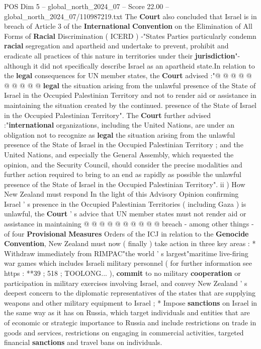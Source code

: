 \begin{textsample}{POS Dim 5 – global\_north\_2024\_07 – Score 22.00 – global\_north\_2024\_07/110987219.txt}
The \textbf{Court} also concluded that Israel is in breach of Article 3 of the \textbf{International} \textbf{Convention} on the Elimination of All Forms of \textbf{Racial} Discrimination ( ICERD ) -"States Parties particularly condemn \textbf{racial} segregation and apartheid and undertake to prevent, prohibit and eradicate all practices of this nature in territories under their \textbf{jurisdiction}"- although it did not specifically describe Israel as an apartheid state.In relation to the \textbf{legal} consequences for UN member states, the \textbf{Court} advised :"@ @ @ @ @ @ @ @ @ @ \textbf{legal} the situation arising from the unlawful presence of the State of Israel in the Occupied Palestinian Territory and not to render aid or assistance in maintaining the situation created by the continued. presence of the State of Israel in the Occupied Palestinian Territory".
The \textbf{Court} further advised :"\textbf{international} organizations, including the United Nations, are under an obligation not to recognize as \textbf{legal} the situation arising from the unlawful presence of the State of Israel in the Occupied Palestinian Territory ; and the United Nations, and especially the General Assembly, which requested the opinion, and the Security Council, should consider the precise modalities and further action required to bring to an end as rapidly as possible the unlawful presence of the State of Israel in the Occupied Palestinian Territory". ii ) How New Zealand must respond In the light of this Advisory Opinion confirming Israel ' s presence in the Occupied Palestinian Territories ( including Gaza ) is unlawful, the \textbf{Court} ' s advice that UN member states must not render aid or assistance in maintaining @ @ @ @ @ @ @ @ @ @ breach - among other things - of four \textbf{Provisional} \textbf{Measures} Orders of the ICJ in relation to the \textbf{Genocide} \textbf{Convention}, New Zealand must now ( finally ) take action in three key areas : * Withdraw immediately from RIMPAC"the world ' s largest"maritime live-firing war games which includes Israeli military personnel ( for further information see https : **39 ; 518 ; TOOLONG... ), \textbf{commit} to no military \textbf{cooperation} or participation in military exercises involving Israel, and convey New Zealand ' s deepest concern to the diplomatic representatives of the states that are supplying weapons and other military equipment to Israel ; * Impose \textbf{sanctions} on Israel in the same way as it has on Russia, which target individuals and entities that are of economic or strategic importance to Russia and include restrictions on trade in goods and services, restrictions on engaging in commercial activities, targeted financial \textbf{sanctions} and travel bans on individuals.

\end{textsample}
